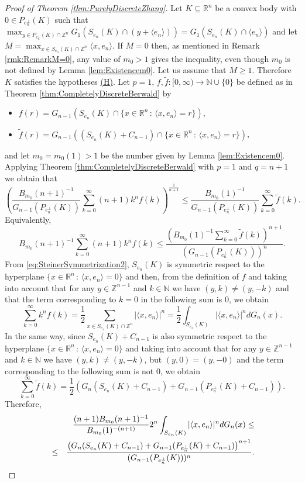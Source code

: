 \documentclass[10pt]{amsart}
\def\R{\mathbb{R}}
\def\N{\mathbb{N}}
\def\Z{\mathbb{Z}}
\numberwithin{equation}{section}
\begin{document}
\begin{proof}[Proof of Theorem \ref{thm:PurelyDiscreteZhang}]
Let $K\subseteq\R^n$ be a convex body with $0\in P_{e_n^\perp}(K)$ such that $\displaystyle{\max_{y\in P_{e_n^\perp}(K)\cap\Z^n}G_1(S_{e_n}(K)\cap(y+\langle e_n\rangle))=G_1(S_{e_n}(K)\cap\langle e_n\rangle)}$ and let\\ $\displaystyle{M=\max_{x\in S_{e_n}(K)\cap\Z^n}\langle x,e_n\rangle}$. If $M=0$ then, as mentioned in Remark \ref{rmk:RemarkM=0}, any value of $m_0>1$ gives the inequality, even though $m_0$ is not defined by Lemma \ref{lem:Existencem0}. Let us assume that $M\geq 1$. Therefore $K$ satisfies the hypotheses \hyperlink{(H)}{(H)}. Let $p=1$, $f,\tilde{f}:[0,\infty)\to\N\cup\{0\}$ be defined as in Theorem \ref{thm:CompletelyDiscreteBerwald} by
\begin{itemize}
\item $f(r)=G_{n-1}(S_{e_n}(K)\cap\{x\in\R^n\,:\,\langle x,e_n\rangle=r\})$,
\item $\tilde{f}(r)=G_{n-1}((S_{e_n}(K)+C_{n-1})\cap\{x\in\R^n\,:\,\langle x,e_n\rangle=r\})$,
\end{itemize}
and let $m_0=m_0(1)>1$ be the number given by Lemma \ref{lem:Existencem0}. Applying Theorem \ref{thm:CompletelyDiscreteBerwald} with $p=1$ and $q=n+1$ we obtain that
$$
\left(\frac{B_{m_0}(n+1)^{-1}}{G_{n-1}(P_{e_n^\perp}(K))}\sum_{k=0}^{\infty}(n+1)k^{n}f(k)\right)^\frac{1}{n+1}\leq \frac{B_{m_0}(1)^{-1}}{G_{n-1}(P_{e_n^\perp}(K))}\sum_{k=0}^{\infty}\tilde{f}(k).
$$
Equivalently,
$$
B_{m_0}(n+1)^{-1}\sum_{k=0}^{\infty}(n+1)k^{n}f(k)\leq \frac{\left(B_{m_0}(1)^{-1}\sum_{k=0}^{\infty}\tilde{f}(k)\right)^{n+1}}{(G_{n-1}(P_{e_n^\perp}(K)))^n}.
$$
From \eqref{eq:SteinerSymmetrization2}, $S_{e_n}(K)$ is symmetric respect to the hyperplane $\{x\in\R^n\,:\,\langle x, e_n\rangle=0\}$ and then, from the definition of $f$ and taking into account that for any $y\in\Z^{n-1}$ and $k\in\N$ we have $(y,k)\neq(y,-k)$ and that the term corresponding to $k=0$ in the following sum is $0$, we obtain
$$
\sum_{k=0}^{\infty}k^{n}f(k)=\frac{1}{2}\sum_{x\in S_{e_n}(K)\cap\Z^n}|\langle x,e_n\rangle|^n=\frac{1}{2}\int_{S_{e_n}(K)}|\langle x,e_n\rangle|^ndG_n(x).
$$
In the same way, since $S_{e_n}(K)+C_{n-1}$ is also symmetric respect to the hyperplane $\{x\in\R^n\,:\,\langle x, e_n\rangle=0\}$ and taking into account that for any $y\in\Z^{n-1}$ and $k\in\N$ we have $(y,k)\neq(y,-k)$, but $(y,0)=(y,-0)$ and the term corresponding to the following sum is not 0, we obtain
$$
\sum_{k=0}^{\infty}\tilde{f}(k)=\frac{1}{2}\left(G_n(S_{e_n}(K)+C_{n-1})+G_{n-1}(P_{e_n^\perp}(K)+C_{n-1})\right).
$$
Therefore,
\begin{eqnarray*}
&&\frac{(n+1)B_{m_0}(n+1)^{-1}}{B_{m_0}(1)^{-(n+1)}}2^n\int_{S_{e_n}(K)}|\langle x,e_n\rangle|^ndG_n(x)\leq\cr
&\leq&\frac{\left(G_n(S_{e_n}(K)+C_{n-1})+G_{n-1}(P_{e_n^\perp}(K)+C_{n-1})\right)^{n+1}}{(G_{n-1}(P_{e_n^\perp}(K)))^n}.
\end{eqnarray*}
\end{proof}
\end{document}
